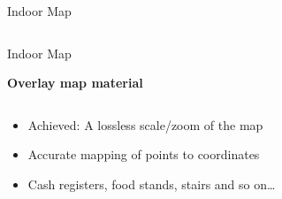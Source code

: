 \documentclass[11pt]{beamer}
\begin{document}
\begin{frame}{Indoor Map}
\begin{columns}[T]
\begin{column}{.4\textwidth}
  \end{column}
\end{columns}

\end{frame}


\begin{frame}{Indoor Map}

\textbf{Overlay map material}

  \begin{columns}[T]
  \begin{column}{.6\textwidth}
  \begin{itemize}
    \item Achieved: A lossless scale/zoom of the map
    \item Accurate mapping of points to coordinates
    \item Cash registers, food stands, stairs and so on\ldots
  \end{itemize}
  \end{column}
  \begin{column}{.4\textwidth}

\end{column}
\end{columns}
\end{frame}
\end{document}
